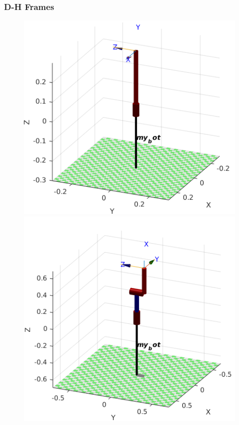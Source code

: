 \documentclass{article}
\begin{document}
\subsubsection*{D-H Frames}

\begin{center}
\begin{figure}[!htb]
   \begin{minipage}{0.33\textwidth}
     \centering
     \includegraphics[width=\linewidth]{images/3-dof/frame1.png}
   \end{minipage}\hfill
   \begin{minipage}{0.33\textwidth}
     \centering
     \includegraphics[width=\linewidth]{images/3-dof/frame2_q2_90.png}

\end{minipage}
\end{figure}
\end{center}
\end{document}
